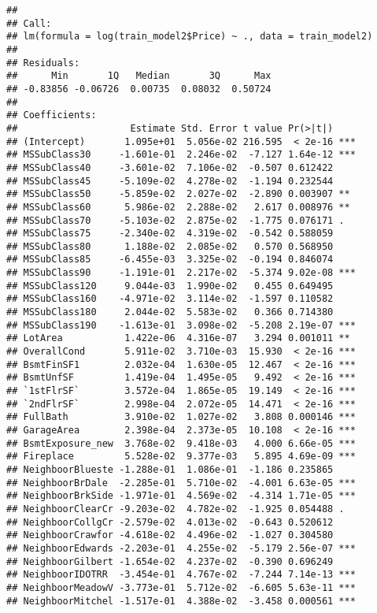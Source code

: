 \documentclass[]{article}
\begin{document}
\begin{verbatim}
## 
## Call:
## lm(formula = log(train_model2$Price) ~ ., data = train_model2)
## 
## Residuals:
##      Min       1Q   Median       3Q      Max 
## -0.83856 -0.06726  0.00735  0.08032  0.50724 
## 
## Coefficients:
##                    Estimate Std. Error t value Pr(>|t|)    
## (Intercept)       1.095e+01  5.056e-02 216.595  < 2e-16 ***
## MSSubClass30     -1.601e-01  2.246e-02  -7.127 1.64e-12 ***
## MSSubClass40     -3.601e-02  7.106e-02  -0.507 0.612422    
## MSSubClass45     -5.109e-02  4.278e-02  -1.194 0.232544    
## MSSubClass50     -5.859e-02  2.027e-02  -2.890 0.003907 ** 
## MSSubClass60      5.986e-02  2.288e-02   2.617 0.008976 ** 
## MSSubClass70     -5.103e-02  2.875e-02  -1.775 0.076171 .  
## MSSubClass75     -2.340e-02  4.319e-02  -0.542 0.588059    
## MSSubClass80      1.188e-02  2.085e-02   0.570 0.568950    
## MSSubClass85     -6.455e-03  3.325e-02  -0.194 0.846074    
## MSSubClass90     -1.191e-01  2.217e-02  -5.374 9.02e-08 ***
## MSSubClass120     9.044e-03  1.990e-02   0.455 0.649495    
## MSSubClass160    -4.971e-02  3.114e-02  -1.597 0.110582    
## MSSubClass180     2.044e-02  5.583e-02   0.366 0.714380    
## MSSubClass190    -1.613e-01  3.098e-02  -5.208 2.19e-07 ***
## LotArea           1.422e-06  4.316e-07   3.294 0.001011 ** 
## OverallCond       5.911e-02  3.710e-03  15.930  < 2e-16 ***
## BsmtFinSF1        2.032e-04  1.630e-05  12.467  < 2e-16 ***
## BsmtUnfSF         1.419e-04  1.495e-05   9.492  < 2e-16 ***
## `1stFlrSF`        3.572e-04  1.865e-05  19.149  < 2e-16 ***
## `2ndFlrSF`        2.998e-04  2.072e-05  14.471  < 2e-16 ***
## FullBath          3.910e-02  1.027e-02   3.808 0.000146 ***
## GarageArea        2.398e-04  2.373e-05  10.108  < 2e-16 ***
## BsmtExposure_new  3.768e-02  9.418e-03   4.000 6.66e-05 ***
## Fireplace         5.528e-02  9.377e-03   5.895 4.69e-09 ***
## NeighboorBlueste -1.288e-01  1.086e-01  -1.186 0.235865    
## NeighboorBrDale  -2.285e-01  5.710e-02  -4.001 6.63e-05 ***
## NeighboorBrkSide -1.971e-01  4.569e-02  -4.314 1.71e-05 ***
## NeighboorClearCr -9.203e-02  4.782e-02  -1.925 0.054488 .  
## NeighboorCollgCr -2.579e-02  4.013e-02  -0.643 0.520612    
## NeighboorCrawfor -4.618e-02  4.496e-02  -1.027 0.304580    
## NeighboorEdwards -2.203e-01  4.255e-02  -5.179 2.56e-07 ***
## NeighboorGilbert -1.654e-02  4.237e-02  -0.390 0.696249    
## NeighboorIDOTRR  -3.454e-01  4.767e-02  -7.244 7.14e-13 ***
## NeighboorMeadowV -3.773e-01  5.712e-02  -6.605 5.63e-11 ***
## NeighboorMitchel -1.517e-01  4.388e-02  -3.458 0.000561 ***

\end{verbatim}
\end{document}
